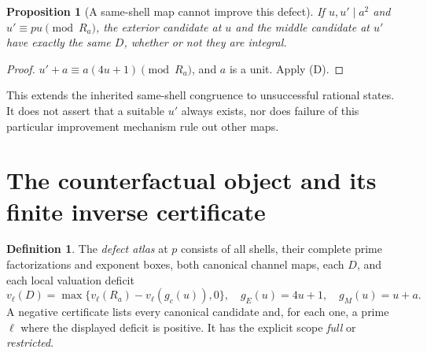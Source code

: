 \documentclass[11pt]{article}
\newtheorem{proposition}[theorem]{Proposition}
\theoremstyle{definition}\newtheorem{definition}[theorem]{Definition}
\theoremstyle{remark}\newtheorem{remark}[theorem]{Remark}
\begin{document}
\begin{proposition}[A same-shell map cannot improve this defect]\label{prop:transport}
If $u,u'\mid a^2$ and $u'\equiv pu\pmod{R_a}$, the exterior
candidate at $u$ and the middle candidate at $u'$ have exactly the same $D$,
whether or not they are integral.
\end{proposition}
\begin{proof}
$u'+a\equiv a(4u+1)\pmod{R_a}$, and $a$ is a unit. Apply (D).
\end{proof}
This extends the inherited same-shell congruence to unsuccessful rational
states. It does not assert that a suitable $u'$ always exists, nor does
failure of this particular improvement mechanism rule out other maps.

\section{The counterfactual object and its finite inverse certificate}
\begin{definition}
The \emph{defect atlas} at $p$ consists of all shells, their complete prime
factorizations and exponent boxes, both canonical channel maps, each $D$,
and each local valuation deficit
\[
 v_\ell(D)=\max\{v_\ell(R_a)-v_\ell(g_c(u)),0\},
 \quad g_E(u)=4u+1,\quad g_M(u)=u+a.
\]
A negative certificate lists every canonical candidate and, for each one,
a prime $\ell$ where the displayed deficit is positive. It has the
explicit scope \emph{full} or \emph{restricted}.
\end{definition}
\end{document}
